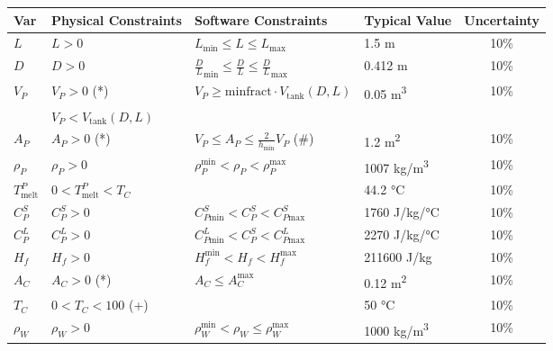 \documentclass[12pt]{article}
\begin{document}
\begin{table}[!h]
  \caption{Input Variables} \label{TblInputVar}
  \renewcommand{\arraystretch}{1.2}
\noindent \begin{longtable*}{l l l l c} 
  \toprule
  \textbf{Var} & \textbf{Physical Constraints} & \textbf{Software Constraints} &
                             \textbf{Typical Value} & \textbf{Uncertainty}\\
  \midrule 
  $L$ & $L > 0$ & $L_{\text{min}} \leq L \leq L_{\text{max}}$ & 1.5 \si[per-mode=symbol] {\metre} & 10\%
  \\
  $D$ & $D > 0$ & ${\frac{D}{L}}_\text{min} \leq \frac{D}{L} \leq {\frac{D}{L}}_\text{max}$ 
	& 0.412 \si[per-mode=symbol] {\metre} & 10\%
  \\
  $V_P$ & $V_P > 0$ (*) & $ V_P \geq \text{minfract} \cdot V_{\text{tank}}(D, L) $ &
	0.05 \si[per-mode=symbol] {\cubic\metre} & 10\%
  \\
  & $V_P < V_{\text{tank}}(D, L)$ & & & 
  \\
  $A_P$ & $A_P > 0$ (*) & $V_P \leq A_P \leq \frac{2}{h_\text{min}} V_P$ (\#) & 1.2
       \si[per-mode=symbol] {\square\metre} & 10\%
  \\
  $\rho_P$ & $\rho_P > 0$ & $\rho_P^{\text{min}} < \rho_P < \rho_P^{\text{max}}$ & 1007 \si[per-mode=symbol]
                            {\kilogram\per\cubic\metre} & 10\%
  \\
  $T_\text{melt}^{P}$ 	& $0 < T_\text{melt}^{P} < T_C$ & &  44.2 
	\si[per-mode=symbol] {\celsius} & 10\%
  \\
  $C_P^S$ & $C_P^S > 0$ & $C_{P\text{min}}^S < C_P^S < C_{P\text{max}}^S$ & 1760 
	\si[per-mode=symbol] {\joule\per\kilo\gram\per\celsius} & 10\%
  \\
  $C_P^L$ & $C_P^L > 0$ & $C_{P\text{min}}^L < C_P^S < C_{P\text{max}}^L$ & 2270 
	\si[per-mode=symbol] {\joule\per\kilo\gram\per\celsius} & 10\%
  \\
  $H_f$ & $H_f > 0$ & $H_f^{\text{min}} < H_f < H_f^{\text{max}}$ & 211600 
	\si[per-mode=symbol] {\joule\per\kilo\gram} & 10\%
  \\
  $A_C$ & $A_C > 0$ (*) & $A_C \leq A_C^{\text{max}}$ & 0.12 \si[per-mode=symbol] {\square\metre} & 10\%
  \\
  $T_C$ & $0 < T_C < 100$ (+)	& & 50 \si[per-mode=symbol] {\celsius} & 10\%
  \\
  $\rho_W$ & $\rho_W > 0$ & $\rho_W^{\text{min}} < \rho_W \leq \rho_W^{\text{max}}$ 
	& 1000 \si[per-mode=symbol] {\kilo\gram\per\cubic\metre} & 10\%
  \\

\end{longtable*}
\end{table}
\end{document}

